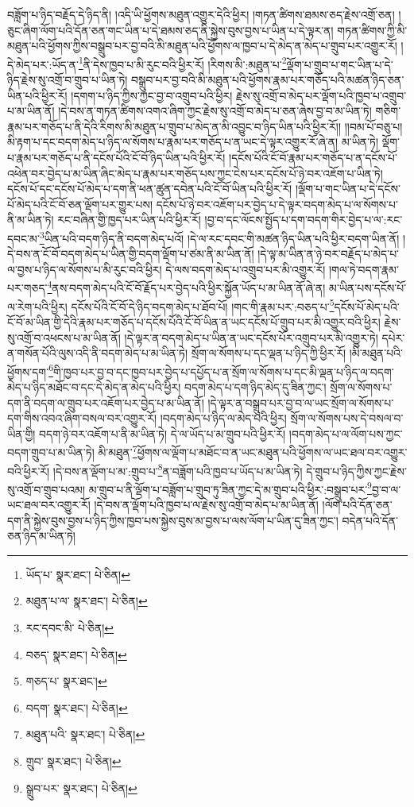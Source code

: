 བཟློག་པ་ཉིད་བརྗོད་དེ་ཉིད་ནི། །འདི་ཡི་ཕྱོགས་མཐུན་འགྱུར་དེའི་ཕྱིར། །གཏན་ཚིགས་ཐམས་ཅད་རྗེས་འགྲོ་ཅན། །ཅུང་ཞིག་ལོག་པའི་དོན་ཅན་གང་ཡིན་པ་དེ་ཐམས་ཅད་ནི་སྐྱེས་བུས་བྱས་པ་ཡིན་པ་དེ་ལྟར་ན། གཏན་ཚིགས་ཀྱི་མི་མཐུན་པའི་ཕྱོགས་ཀྱིས་བསྒྲུབ་པར་བྱ་བའི་མི་མཐུན་པའི་ཕྱོགས་ལ་ཁྱབ་པ་དེ་མེད་ན་མེད་པ་གྲུབ་པར་འགྱུར་རོ། །དེ་མེད་པར་:ཡོད་ན་\footnote{ཡོད་པ་  སྣར་ཐང་།  པེ་ཅིན། }ནི་དེས་ཁྱབ་པ་མི་རུང་བའི་ཕྱིར་རོ། །རིགས་མི་:མཐུན་པ་\footnote{མཐུན་པ་ལ་  སྣར་ཐང་།  པེ་ཅིན། }ལྡོག་པ་གྲུབ་པ་གང་ཡིན་པ་དེ་ཉིད་རྗེས་སུ་འགྲོ་བ་གྲུབ་པ་ཡིན་ཏེ། བསྒྲུབ་པར་བྱ་བའི་མི་མཐུན་པའི་ཕྱོགས་རྣམ་པར་གཅོད་པའི་མཚན་ཉིད་ཅན་ཡིན་པའི་ཕྱིར་རོ། །དགག་པ་ཉིད་ཀྱིས་ཀྱང་བྱ་བ་འགྲུབ་པའི་ཕྱིར། རྗེས་སུ་འགྲོ་བ་མེད་པར་ལྡོག་པའི་ཁྱབ་པ་འགྲུབ་པ་མ་ཡིན་ནོ། །དེ་བས་ན་གཏན་ཚིགས་འགའ་ཞིག་ཀྱང་རྗེས་སུ་འགྲོ་བ་མེད་པ་ཅན་ཞེས་བྱ་བ་མ་ཡིན་ཏེ། གཅིག་རྣམ་པར་གཅོད་པ་ནི་དེའི་རིགས་མི་མཐུན་པ་གྲུབ་པ་མེད་ན་མི་འབྱུང་བ་ཉིད་ཡིན་པའི་ཕྱིར་རོ།། །།བམ་པོ་བཅུ་པ། མི་རྟག་པ་དང་བདག་མེད་པ་ཉིད་ལ་སོགས་པ་རྣམ་པར་གཅོད་པ་ན་ཡང་དེ་ལྟར་འགྱུར་རོ་ཞེ་ན། མ་ཡིན་ཏེ། ལྡོག་པ་རྣམ་པར་གཅོད་པ་ནི་དངོས་པོའི་ངོ་བོ་ཉིད་ཡིན་པའི་ཕྱིར་རོ། །དངོས་པོའི་ངོ་བོ་རྣམ་པར་གཅོད་པ་ན་དངོས་པོ་འཕེན་བར་བྱེད་པ་མ་ཡིན་ཞིང་མེད་པ་རྣམ་པར་གཅོད་པས་ཀྱང་ངེས་པར་དངོས་པོ་ཉེ་བར་འཇོག་པ་ཡིན་ཏེ། དངོས་པོ་དང་དངོས་པོ་མེད་པ་དག་ནི་ཕན་ཚུན་དབེན་པའི་ངོ་བོ་ཡིན་པའི་ཕྱིར་རོ། །ལྡོག་པ་གང་ཡིན་པ་དེ་དངོས་པོ་མེད་པའི་ངོ་བོ་ཅན་ལྡོག་པར་གྱུར་པས། དངོས་པོ་ཉེ་བར་འཇོག་པར་བྱེད་པ་དེ་ལྟར་བདག་མེད་པ་ལ་སོགས་པ་ནི་མ་ཡིན་ཏེ། རང་བཞིན་གྱི་ཁྱད་པར་ཡིན་པའི་ཕྱིར་རོ། །བྱ་བ་དང་ལོངས་སྤྱོད་པ་དག་བདག་གིར་བྱེད་པ་ལ་:རང་དབང་མ་\footnote{རང་དབང་མི་  པེ་ཅིན། }ཡིན་པའི་བདག་ཉིད་ནི་བདག་མེད་པའོ། །དེ་ལ་རང་དབང་གི་མཚན་ཉིད་ཡིན་པའི་ཕྱིར་བདག་ཡིན་ནོ། །དེ་བས་ན་ངོ་བོ་བདག་མེད་པ་ཡིན་གྱི་བདག་ལྡོག་པ་ཙམ་ནི་མ་ཡིན་ནོ། །དེ་ལྟ་མ་ཡིན་ན་ཉེ་བར་བརྗོད་པ་མེད་པ་ལ་བྱས་པ་ཉིད་ལ་སོགས་པ་མི་རུང་བའི་ཕྱིར། དེ་ལས་བདག་མེད་པ་འགྲུབ་པར་མི་འགྱུར་རོ། །གལ་ཏེ་བདག་རྣམ་པར་གཅད་\footnote{བཅད་  སྣར་ཐང་།  པེ་ཅིན། }ནས་བདག་མེད་པའི་ངོ་བོ་རྗོད་པར་བྱེད་པའི་ཕྱིར་སྐྱོན་ཡོད་པ་མ་ཡིན་ནོ་ཞེ་ན། མ་ཡིན་པས་དངོས་པོ་ལ་རེག་པའི་ཕྱིར། དངོས་པོའི་ངོ་བོ་དེ་ཉིད་བདག་མེད་པ་ཐོབ་པོ། །གང་གི་རྣམ་པར་:བཅད་པ་\footnote{གཅད་པ་  སྣར་ཐང་། }དངོས་པོ་མེད་པའི་ངོ་བོ་མ་ཡིན་གྱི་དེའི་རྣམ་པར་གཅོད་པ་དངོས་པོའི་ངོ་བོ་ཡིན་ན་ཡང་དངོས་པོ་གྲུབ་པར་མི་འགྱུར་བའི་ཕྱིར། རྗེས་སུ་འགྲོ་བ་འཕངས་པ་མ་ཡིན་ནོ། །དེ་ལྟར་ན་བདག་མེད་པ་ཡིན་ན་ཡང་དངོས་པོར་འགྲུབ་པར་མི་འགྱུར་ཏེ། དཔེར་ན་གསོན་པོའི་ལུས་འདི་ནི་བདག་མེད་པ་མ་ཡིན་ཏེ། སྲོག་ལ་སོགས་པ་དང་ལྡན་པ་ཉིད་ཀྱི་ཕྱིར་རོ། །མི་མཐུན་པའི་ཕྱོགས་དག་\footnote{བདག་  སྣར་ཐང་།  པེ་ཅིན། }གི་ཁྱབ་པར་བྱ་བ་དང་ཁྱབ་པར་བྱེད་པ་དཔྱོད་པ་ན་སྲོག་ལ་སོགས་པ་དང་མི་ལྡན་པ་ཉིད་ལ་བདག་མེད་པ་ཉིད་མཐོང་བ་དང་དེ་མེད་ན་མེད་པའི་ཕྱིར། བདག་མེད་པ་དག་ཉིད་མེད་དུ་ཟིན་ཀྱང་། སྲོག་ལ་སོགས་པ་དག་ནི་བདག་ལ་གྲུབ་པར་འཇོག་པར་བྱེད་པ་མ་ཡིན་ནོ། །དེ་ལྟར་ན་བསྒྲུབ་པར་བྱ་བ་ལ་ཡང་སྲོག་ལ་སོགས་པ་དག་གིས་འབའ་ཞིག་བསལ་བར་འགྱུར་རོ། །བདག་མེད་པ་ཉིད་ལ་མེད་པའི་ཕྱིར། སྲོག་ལ་སོགས་པས་དེ་བསལ་བ་ཡིན་གྱི། བདག་ཉེ་བར་འཇོག་པ་ནི་མ་ཡིན་ཏེ། དེ་ལ་ཡོད་པ་མ་གྲུབ་པའི་ཕྱིར་རོ། །བདག་མེད་པ་ལ་ལོག་པས་ཀྱང་བདག་གྲུབ་པ་མ་ཡིན་ཏེ། མི་མཐུན་\footnote{མཐུན་པའི་  སྣར་ཐང་།  པེ་ཅིན། }ཕྱོགས་ལ་ལྡོག་པ་མཐོང་བ་ན་ཡང་མཐུན་པའི་ཕྱོགས་ལ་ཡང་ཐལ་བར་འགྱུར་བའི་ཕྱིར་རོ། །དེ་བས་ན་ལྡོག་པ་མ་:གྲུབ་པ་\footnote{གྲུབ་  སྣར་ཐང་།  པེ་ཅིན། }ན་བཟློག་པའི་ཁྱབ་པ་ཡོད་པ་མ་ཡིན་ཏེ། དེ་གྲུབ་པ་ཉིད་ཀྱིས་ཀྱང་རྗེས་སུ་འགྲོ་བ་གྲུབ་པའམ། མ་གྲུབ་པ་ནི་ལྡོག་པ་བཟློག་པ་གྲུབ་ཏུ་ཟིན་ཀྱང་དེ་མ་གྲུབ་པའི་ཕྱིར་:བསྒྲུབ་པར་\footnote{སྒྲུབ་པར་  སྣར་ཐང་།  པེ་ཅིན། }བྱ་བ་ལ་ཡང་ཐལ་བར་འགྱུར་རོ། །དེ་བས་ན་ལྡོག་པའི་ཁྱབ་པ་ལ་རྗེས་སུ་འགྲོ་བ་མེད་པ་མ་ཡིན་ནོ། །ལོག་པའི་དོན་ཅན་དག་ནི་སྐྱེས་བུས་བྱས་པ་ཉིད་ཀྱིས་ཁྱབ་པས་སྐྱེས་བུས་མ་བྱས་པ་ལས་ལོག་པ་ཡིན་དུ་ཟིན་ཀྱང་། བདེན་པའི་དོན་ཅན་ཉིད་མ་ཡིན་ཏེ། 